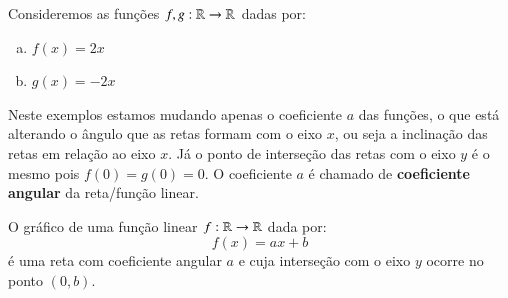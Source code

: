 \begin{itemize}
  Consideremos as funções $f, g: \mathbb{R} \to \mathbb{R}$ dadas por:
 \begin{enumerate}[a)]
  \item $f(x)= 2x$
  \item $g(x)= -2x$
 \end{enumerate}
  
 \begin{figure}[H]
  \end{figure} 
  Neste exemplos estamos mudando apenas o coeficiente $a$ das funções, o que está alterando o ângulo que as retas formam com o eixo $x$, ou seja a inclinação das retas em relação ao eixo $x$. Já o ponto de interseção das retas com o eixo $y$ é o mesmo pois $f(0)= g(0)= 0$. O coeficiente $a$ é chamado de \textbf{coeficiente angular} da reta/função linear.
  
   \vskip0.3cm
 \colorbox{amarelo}{
 \begin{minipage}{0.9\linewidth}
 \begin{center}
 O gráfico de uma função linear $f: \mathbb{R} \to \mathbb{R}$ dada por:
 \[f(x) = ax + b\]
 é uma reta com coeficiente angular $a$ e cuja interseção com o eixo $y$ ocorre no ponto $(0, b)$.
 \end{center}
 \end{minipage}}
 \vskip0.3cm
 

\end{itemize}
